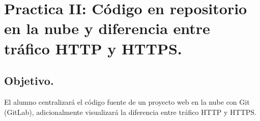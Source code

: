 \documentclass[12pt]{article}
\begin{document}

{\color{red} \section*{\textbf{Practica II: Código en repositorio en la nube y diferencia entre tráfico HTTP y HTTPS.}}}
\vspace{1em}

{\color{blue} \subsection*{\textbf{Objetivo.}}}
\vspace{1em}
El alumno centralizará el código fuente de un proyecto web en la nube con Git (GitLab), adicionalmente visualizará la diferencia entre tráfico HTTP y HTTPS.
\vspace{2em}
\end{document}
